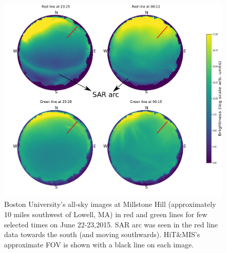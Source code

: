 \begin{figure}
	\centering\includegraphics[width=35pc]{allsky.pdf}
	\caption{Boston University's all-sky images at Millstone Hill (approximately 10 miles southwest of Lowell, MA) in red and green lines for few selected times on June 22-23,2015. SAR arc was seen in the red line data towards the south (and moving southwards). HiT\&MIS's approximate FOV is shown with a black line on each image.}
	\label{fig:allsky}
\end{figure}





